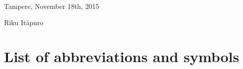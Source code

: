 \documentclass[12pt,a4paper,english]{tutthesis}
\begin{document}
\begin{otherlanguage}{english}
~ 

Tampere, November 18th, 2015
~


Riku Itäpuro

%
%

\renewcommand\contentsname{Table of Contents} %
\setcounter{tocdepth}{3}                      %

\tableofcontents                              %

\renewcommand\listfigurename{List of Figures}  %
\listoffigures                                 %
\markboth{}{}                                  %

\renewcommand\listtablename{List of Tables}    %
\listoftables                                  %
\markboth{}{}                                  %


\lstlistoflistings                                %


%
%

\chapter*{List of abbreviations and symbols}
\markboth{}{}                                %


\end{otherlanguage}
\end{document}

